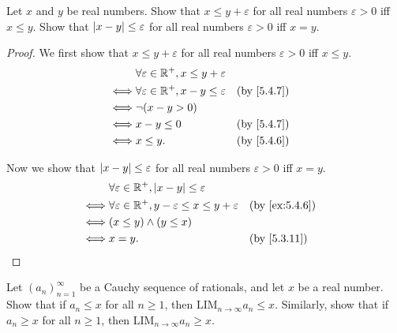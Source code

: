 \begin{ex}\label{ex:5.4.7}
	Let \(x\) and \(y\) be real numbers.
	Show that \(x \leq y + \varepsilon\) for all real numbers \(\varepsilon > 0\) iff \(x \leq y\).
	Show that \(\left\lvert x - y\right\rvert \leq \varepsilon\) for all real numbers \(\varepsilon > 0\) iff \(x = y\).
\end{ex}

\begin{proof}
	We first show that \(x \leq y + \varepsilon\) for all real numbers \(\varepsilon > 0\) iff \(x \leq y\).
	\begin{align*}
		     & \forall \varepsilon \in \R^+, x \leq y + \varepsilon                 \\
		\iff & \forall \varepsilon \in \R^+, x - y \leq \varepsilon &  & \by{5.4.7} \\
		\iff & \lnot (x - y > 0)                                                    \\
		\iff & x - y \leq 0                                         &  & \by{5.4.7} \\
		\iff & x \leq y.                                            &  & \by{5.4.6}
	\end{align*}

	Now we show that \(\left\lvert x - y\right\rvert \leq \varepsilon\) for all real numbers \(\varepsilon > 0\) iff \(x = y\).
	\begin{align*}
		     & \forall \varepsilon \in \R^+, \abs{x - y} \leq \varepsilon                                   \\
		\iff & \forall \varepsilon \in \R^+, y - \varepsilon \leq x \leq y + \varepsilon &  & \by{ex:5.4.6} \\
		\iff & (x \leq y) \land (y \leq x)                                                                  \\
		\iff & x = y.                                                                    &  & \by{5.3.11}
	\end{align*}
\end{proof}

\begin{ex}\label{ex:5.4.8}
	Let \((a_n)_{n = 1}^{\infty}\) be a Cauchy sequence of rationals, and let \(x\) be a real number.
	Show that if \(a_n \leq x\) for all \(n \geq 1\), then \(\text{LIM}_{n \to \infty} a_n \leq x\).
	Similarly, show that if \(a_n \geq x\) for all \(n \geq 1\), then \(\text{LIM}_{n \to \infty} a_n \geq x\).
\end{ex}

